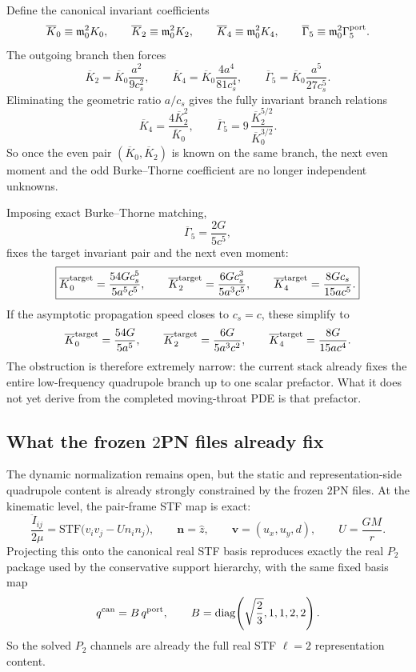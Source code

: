 \documentclass[11pt]{article}
\begin{document}
Define the canonical invariant coefficients
\[
\overline K_0\equiv \mathfrak m_0^2K_0,
\qquad
\overline K_2\equiv \mathfrak m_0^2K_2,
\qquad
\overline K_4\equiv \mathfrak m_0^2K_4,
\qquad
\overline\Gamma_5\equiv \mathfrak m_0^2\Gamma_5^{\rm port}.
\]
The outgoing branch then forces
\begin{equation}
\boxed{
\overline K_2=\overline K_0\frac{a^2}{9c_s^2},
\qquad
\overline K_4=\overline K_0\frac{4a^4}{81c_s^4},
\qquad
\overline\Gamma_5=\overline K_0\frac{a^5}{27c_s^5}.
}
\label{eq:qnorm-canonical-branch}
\end{equation}
Eliminating the geometric ratio $a/c_s$ gives the fully invariant branch
relations
\begin{equation}
\boxed{
\overline K_4=\frac{4\overline K_2^2}{\overline K_0},
\qquad
\overline\Gamma_5
=
9\,\frac{\overline K_2^{5/2}}{\overline K_0^{3/2}}.
}
\label{eq:qnorm-canonical-invariants}
\end{equation}
So once the even pair $(\overline K_0,\overline K_2)$ is known on the same
branch, the next even moment and the odd Burke--Thorne coefficient are no
longer independent unknowns.

Imposing exact Burke--Thorne matching,
\[
\overline\Gamma_5=\frac{2G}{5c^5},
\]
fixes the target invariant pair and the next even moment:
\begin{equation}
\boxed{
\overline K_0^{\rm target}=\frac{54Gc_s^5}{5a^5c^5},
\qquad
\overline K_2^{\rm target}=\frac{6Gc_s^3}{5a^3c^5},
\qquad
\overline K_4^{\rm target}=\frac{8Gc_s}{15ac^5}.
}
\label{eq:qnorm-canonical-targets}
\end{equation}
If the asymptotic propagation speed closes to $c_s=c$, these simplify to
\[
\overline K_0^{\rm target}=\frac{54G}{5a^5},
\qquad
\overline K_2^{\rm target}=\frac{6G}{5a^3c^2},
\qquad
\overline K_4^{\rm target}=\frac{8G}{15ac^4}.
\]
The obstruction is therefore extremely narrow: the current stack already fixes
the entire low-frequency quadrupole branch up to one scalar prefactor.  What it
does not yet derive from the completed moving-throat PDE is that prefactor.

\subsection{What the frozen \texorpdfstring{$2$}{2}PN files already fix}
\label{app:qnorm-frozen-2pn}

The dynamic normalization remains open, but the static and representation-side
quadrupole content is already strongly constrained by the frozen $2$PN files.
At the kinematic level, the pair-frame STF map is exact:
\[
\frac{\ddot I_{ij}}{2\mu}
=
\mathrm{STF}\!\bigl(v_iv_j-U n_in_j\bigr),
\qquad
\mathbf n=\hat z,
\qquad
\mathbf v=(u_x,u_y,d),
\qquad
U=\frac{GM}{r}.
\]
Projecting this onto the canonical real STF basis reproduces exactly the real
$P_2$ package used by the conservative support hierarchy, with the same fixed
basis map
\[
q^{\rm can}=B\,q^{\rm port},
\qquad
B=\mathrm{diag}\!\left(\sqrt{\frac23},1,1,2,2\right).
\]
So the solved $P_2$ channels are already the full real STF $\ell=2$
representation content.
\end{document}
